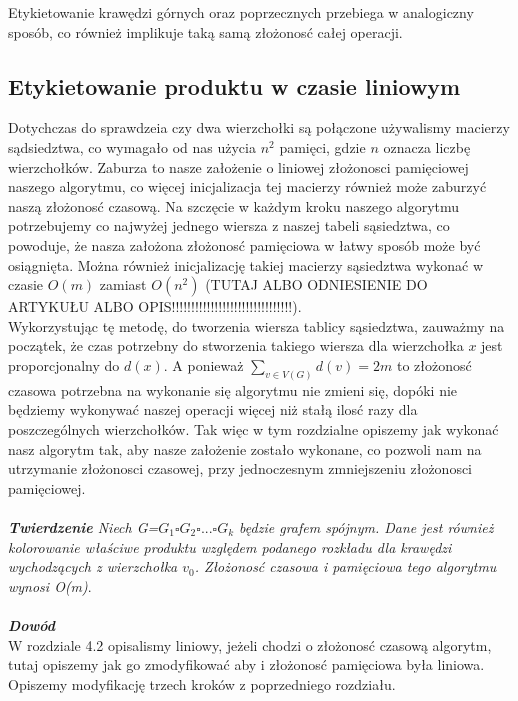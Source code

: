 \documentclass[12pt,a4paper,titlepage]{article}
\begin{document}
\begin{enumerate}
Etykietowanie krawędzi górnych oraz poprzecznych przebiega w analogiczny sposób, co również implikuje taką samą złożonosć całej operacji.\\
\end{enumerate}

\subsection{Etykietowanie produktu w czasie liniowym}
Dotychczas do sprawdzeia czy dwa wierzchołki są połączone używalismy macierzy sądsiedztwa, co wymagało od nas użycia $n^2$ pamięci, gdzie $n$ oznacza liczbę wierzchołków. Zaburza to nasze założenie o liniowej złożonosci pamięciowej naszego algorytmu, co więcej inicjalizacja tej macierzy również może zaburzyć naszą złożonosć czasową. Na szczęcie w każdym kroku naszego algorytmu potrzebujemy co najwyżej jednego wiersza z naszej tabeli sąsiedztwa, co powoduje, że nasza założona złożonosć pamięciowa w łatwy sposób może być osiągnięta. Można również inicjalizację takiej macierzy sąsiedztwa wykonać w czasie $O(m)$ zamiast $O(n^2)$ (TUTAJ ALBO ODNIESIENIE DO ARTYKUŁU ALBO OPIS!!!!!!!!!!!!!!!!!!!!!!!!!!!!!!!).\\
Wykorzystując tę metodę, do tworzenia wiersza tablicy sąsiedztwa, zauważmy na początek, że czas potrzebny do stworzenia takiego wiersza dla wierzchołka $x$ jest proporcjonalny do $d(x)$. A ponieważ $\sum_{v \in V(G)}d(v) = 2m$ to złożonosć czasowa potrzebna na wykonanie się algorytmu nie zmieni się, dopóki nie będziemy wykonywać naszej operacji więcej niż stałą ilosć razy dla poszczególnych wierzchołków. Tak więc w tym rozdzialne opiszemy jak wykonać nasz algorytm tak, aby nasze założenie zostało wykonane, co pozwoli nam na utrzymanie złożonosci czasowej, przy jednoczesnym zmniejszeniu złożonosci pamięciowej.\\
\\
\textit{\textbf{Twierdzenie} Niech G=$G_1 \square G_2 \square ... \square G_k$ będzie grafem spójnym. Dane jest również kolorowanie właściwe produktu względem podanego rozkładu dla krawędzi wychodzących z wierzchołka $v_0$. Złożonosć czasowa i pamięciowa tego algorytmu wynosi O(m)}.\\
\\
\textit{\textbf{Dowód}}\\ 
W rozdziale 4.2 opisalismy liniowy, jeżeli chodzi o złożonosć czasową algorytm, tutaj opiszemy jak go zmodyfikować aby i złożonosć pamięciowa była liniowa. Opiszemy modyfikację trzech kroków z poprzedniego rozdziału.\\
\end{document}
